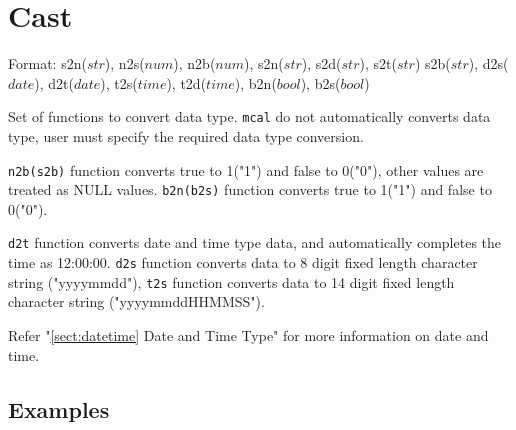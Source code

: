 
%

\section{Cast \label{sect:cast}}

Format: s2n($str$), n2s($num$), n2b($num$), s2n($str$), s2d($str$), s2t($str$)
s2b($str$), d2s($date$), d2t($date$), t2s($time$), t2d($time$), b2n($bool$), b2s($bool$)

Set of functions to convert data type.
\verb|mcal| do not automatically converts data type, user must specify the required data type conversion. 

\verb|n2b(s2b)| function converts true to 1("1") and false to 0("0"), other values are treated as NULL values. 
\verb|b2n(b2s)| function converts true to 1("1") and false to 0("0").

\verb|d2t| function converts date and time type data, and automatically completes the time as 12:00:00.
\verb|d2s| function converts data to 8 digit fixed length character string ("yyyymmdd"), \verb|t2s| function converts data to 14 digit fixed length character string ("yyyymmddHHMMSS").

Refer "\ref{sect:datetime} Date and Time Type" for more information on date and time. 

\subsection*{Examples}


%

